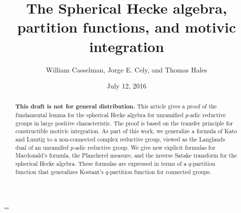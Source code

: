 \documentclass{amsart}
\theoremstyle{plain}
\theoremstyle{definition}
\theoremstyle{remark}
\numberwithin{equation}{subsection}
\begin{document}
\title
    {The Spherical Hecke algebra, partition functions, and motivic integration}
\author{William Casselman, Jorge E. Cely, and Thomas Hales}
\date{July 12, 2016}

\begin{abstract}  
{\bf This draft is not for general distribution.}   
This article gives a proof of the fundamental lemma for the spherical Hecke algebra
for unramified $p$-adic reductive groups in large positive characteristic.  The proof is based on the transfer principle
for constructible motivic integration.    
As part of this work, we generalize a formula of Kato and Lusztig 
to a non-connected complex reductive group, viewed as the Langlands dual of an unramifed $p$-adic reductive group.  
We give new explicit formulas for Macdonald's formula,
the Plancherel measure, and the inverse Satake transform for the spherical Hecke algebra.  These formulas
are expressed in terms of a $q$-partition function that generalizes Kostant's $q$-partition function for connected groups.
\end{abstract}


\parskip=\baselineskip

 \maketitle



    

      
      
       
      
      
\end{document}
